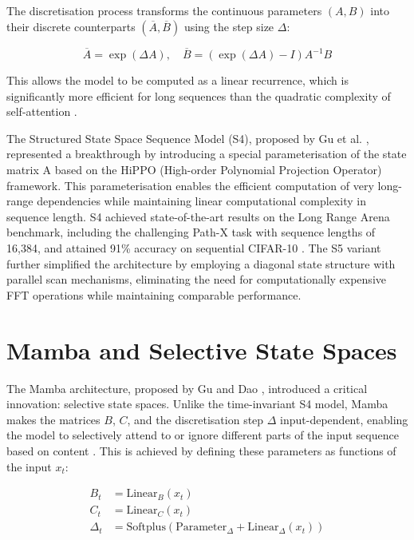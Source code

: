 \documentclass[11pt, a4paper]{report}
\begin{document}
The discretisation process transforms the continuous parameters $(A, B)$ into their discrete counterparts $(\overline{A}, \overline{B})$ using the step size $\Delta$:

\begin{equation}
    \overline{A} = \exp(\Delta A), \quad \overline{B} = (\exp(\Delta A) - I)A^{-1}B
\end{equation}

This allows the model to be computed as a linear recurrence, which is significantly more efficient for long sequences than the quadratic complexity of self-attention \cite{gu2023mamba, somvanshi2025from}.

The Structured State Space Sequence Model (S4), proposed by Gu et al. \cite{gu2022efficiently}, represented a breakthrough by introducing a special parameterisation of the state matrix A based on the HiPPO (High-order Polynomial Projection Operator) framework. This parameterisation enables the efficient computation of very long-range dependencies while maintaining linear computational complexity in sequence length. S4 achieved state-of-the-art results on the Long Range Arena benchmark, including the challenging Path-X task with sequence lengths of 16,384, and attained 91\% accuracy on sequential CIFAR-10 \cite{gu2022efficiently}. The S5 variant \cite{smith2023simplified} further simplified the architecture by employing a diagonal state structure with parallel scan mechanisms, eliminating the need for computationally expensive FFT operations while maintaining comparable performance. 

\section{Mamba and Selective State Spaces}
The Mamba architecture, proposed by Gu and Dao \cite{gu2023mamba}, introduced a critical innovation: selective state spaces. Unlike the time-invariant S4 model, Mamba makes the matrices $B$, $C$, and the discretisation step $\Delta$ input-dependent, enabling the model to selectively attend to or ignore different parts of the input sequence based on content \cite{gu2023mamba}. This is achieved by defining these parameters as functions of the input $x_t$:

\begin{align}
    B_t &= \text{Linear}_B(x_t) \\
    C_t &= \text{Linear}_C(x_t) \\
    \Delta_t &= \text{Softplus}(\text{Parameter}_\Delta + \text{Linear}_\Delta(x_t))
\end{align}
\end{document}
